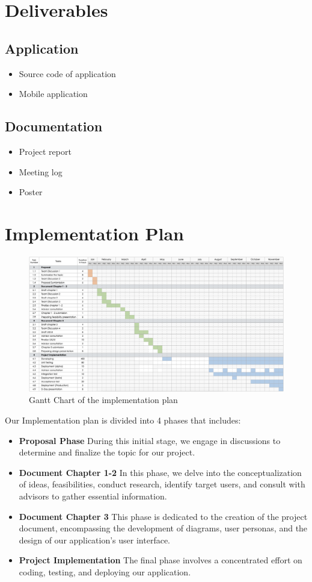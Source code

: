 \section{Deliverables}
\subsection{Application}
\begin{itemize}
	\item Source code of application
	\item Mobile application
\end{itemize}
\subsection{Documentation}
	\begin{itemize}
	\item Project report
	\item Meeting log
	\item Poster
\end{itemize}

\newpage
\section{Implementation Plan}
\begin{figure}[!h]
	\centering
	\includegraphics[width=1\linewidth]{chapter2/gantt_chart.png}
	\caption{Gantt Chart of the implementation plan}
	\label{fig:Gantt Chart of the implementation plan}
\end{figure}
\par
Our Implementation plan is divided into 4 phases that includes:
\begin{itemize}
	\item \textbf{Proposal Phase} During this initial stage, we engage in discussions to determine and finalize the topic for our project.
	\item \textbf{Document Chapter 1-2} In this phase, we delve into the conceptualization of ideas, feasibilities, conduct research, identify target users, and consult with advisors to gather essential information.
	\item \textbf{Document Chapter 3} This phase is dedicated to the creation of the project document, encompassing the development of diagrams, user personas, and the design of our application's user interface.
	\item \textbf{Project Implementation} The final phase involves a concentrated effort on coding, testing, and deploying our application.
\end{itemize}